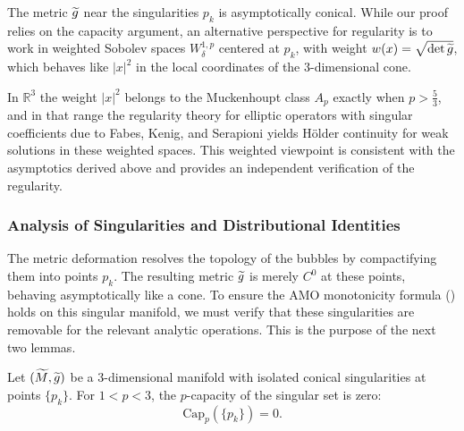 \begin{remark}\label{rem:ConicalRegularity}
The metric $\widetilde{g}$ near the singularities $p_k$ is asymptotically conical. While our proof relies on the capacity argument, an alternative perspective for regularity is to work in weighted Sobolev spaces $W^{1,p}_\delta$ centered at $p_k$, with weight $w(x) = \sqrt{\det \widetilde{g}}$, which behaves like $|x|^2$ in the local coordinates of the $3$-dimensional cone.

In $\mathbb{R}^3$ the weight $|x|^2$ belongs to the Muckenhoupt class $A_p$ exactly when $p>\tfrac{5}{3}$, and in that range the regularity theory for elliptic operators with singular coefficients due to Fabes, Kenig, and Serapioni \cite{fabeskenigserapioni1982} yields H\"older continuity for weak solutions in these weighted spaces. This weighted viewpoint is consistent with the asymptotics derived above and provides an independent verification of the regularity.
\end{remark}

\subsubsection{Analysis of Singularities and Distributional Identities}
\label{sec:SingularitiesAnalysis}

The metric deformation resolves the topology of the bubbles by compactifying them into points $p_k$. The resulting metric $\widetilde{g}$ is merely $C^0$ at these points, behaving asymptotically like a cone. To ensure the AMO monotonicity formula () holds on this singular manifold, we must verify that these singularities are removable for the relevant analytic operations. This is the purpose of the next two lemmas.

\begin{lemma}\label{lem:Capacity}
Let $(\widetilde{M}, \widetilde{g})$ be a 3-dimensional manifold with isolated conical singularities at points $\{p_k\}$. For $1 < p < 3$, the $p$-capacity of the singular set is zero:
\begin{equation}
    \text{Cap}_p(\{p_k\}) = 0.
\end{equation}
\end{lemma}

